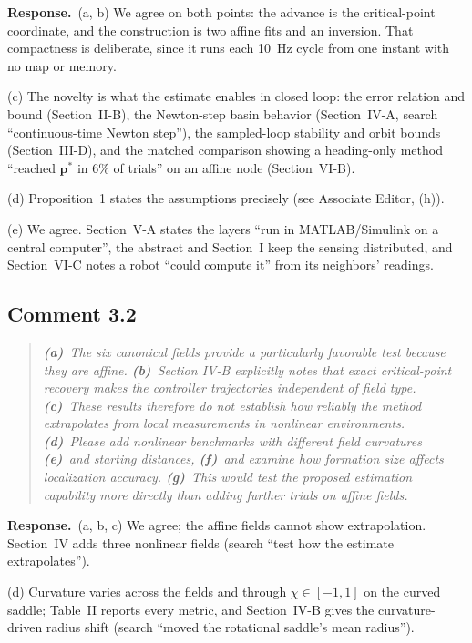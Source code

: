 \documentclass[10pt]{article}
\newcommand{\rev}[1]{#1}                             %
\newcommand{\resp}{\par\textbf{Response.}~}
\begin{document}
\resp (a, b) We agree on both points: the advance is the critical-point coordinate, and the construction is two affine fits and an inversion. That compactness is deliberate, since it runs each 10~Hz cycle from one instant with no map or memory.

(c) The novelty is what the estimate enables in closed loop: the error relation and bound (Section~II-B), the Newton-step basin behavior (Section~IV-A, search ``continuous-time Newton step''), the sampled-loop stability and orbit bounds (Section~III-D), and the matched comparison showing a heading-only method ``reached $\mathbf{p}^*$ in \rev{6}\% of trials'' on an affine node (Section~VI-B).

(d) Proposition~1 states the assumptions precisely (see Associate Editor, (h)).

(e) We agree. Section~V-A states the layers ``run in MATLAB/Simulink on a central computer'', the abstract and Section~I keep the sensing distributed, and Section~VI-C notes a robot ``could compute it'' from its neighbors' readings.

\subsection*{Comment 3.2}

\begin{quote}\itshape
\textbf{(a)}~The six canonical fields provide a particularly favorable test because they are affine.
\textbf{(b)}~Section IV-B explicitly notes that exact critical-point recovery makes the controller trajectories independent of field type.
\textbf{(c)}~These results therefore do not establish how reliably the method extrapolates from local measurements in nonlinear environments.
\textbf{(d)}~Please add nonlinear benchmarks with different field curvatures
\textbf{(e)}~and starting distances,
\textbf{(f)}~and examine how formation size affects localization accuracy.
\textbf{(g)}~This would test the proposed estimation capability more directly than adding further trials on affine fields.
\end{quote}

\resp (a, b, c) We agree; the affine fields cannot show extrapolation. Section~IV adds three nonlinear fields (search ``test how the estimate extrapolates'').

(d) Curvature varies across the fields and through $\chi \in [-1, 1]$ on the curved saddle; Table~II reports every metric, and Section~IV-B gives the curvature-driven radius shift (search ``moved the rotational saddle's mean radius'').
\end{document}
